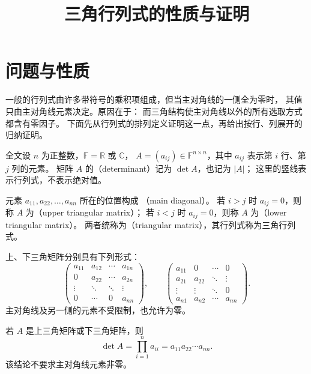 \documentclass[UTF8,12pt,a4paper,fontset=fandol]{ctexart}
\title{三角行列式的性质与证明}
\author{}
\date{}
\begin{document}
\maketitle

\section{问题与性质}

一般的行列式由许多带符号的乘积项组成，但当主对角线的一侧全为零时，
其值只由主对角线元素决定。原因在于：
而三角结构使主对角线以外的所有选取方式都含有零因子。
下面先从行列式的排列定义证明这一点，再给出按行、列展开的归纳证明。

全文设 $n$ 为正整数，$\mathbb F=\mathbb R$ 或 $\mathbb C$，
$A=(a_{ij})\in\mathbb F^{n\times n}$，其中 $a_{ij}$ 表示第 $i$ 行、第 $j$ 列的元素。
矩阵 $A$ 的（determinant）记为 $\det A$，也记为 $|A|$；
这里的竖线表示行列式，不表示绝对值。

\begin{definition}[三角矩阵]
元素 $a_{11},a_{22},\ldots,a_{nn}$ 所在的位置构成
（main diagonal）。
若 $i>j$ 时 $a_{ij}=0$，则称 $A$ 为（upper triangular matrix）；
若 $i<j$ 时 $a_{ij}=0$，则称 $A$ 为（lower triangular matrix）。
两者统称为（triangular matrix），其行列式称为三角行列式。
\end{definition}

上、下三角矩阵分别具有下列形式：
\[
  \begin{pmatrix}
    a_{11}&a_{12}&\cdots&a_{1n}\\
    0&a_{22}&\cdots&a_{2n}\\
    \vdots&\ddots&\ddots&\vdots\\
    0&\cdots&0&a_{nn}
  \end{pmatrix},
  \qquad
  \begin{pmatrix}
    a_{11}&0&\cdots&0\\
    a_{21}&a_{22}&\ddots&\vdots\\
    \vdots&\vdots&\ddots&0\\
    a_{n1}&a_{n2}&\cdots&a_{nn}
  \end{pmatrix}.
\]
主对角线及另一侧的元素不受限制，也允许为零。

\begin{theorem}[三角行列式的值]
\label{thm:triangular-determinant}
若 $A$ 是上三角矩阵或下三角矩阵，则
\begin{equation}
  \det A=\prod_{i=1}^{n}a_{ii}=a_{11}a_{22}\cdots a_{nn}.
  \label{eq:triangular-product}
\end{equation}
该结论不要求主对角线元素非零。
\end{theorem}
\end{document}
